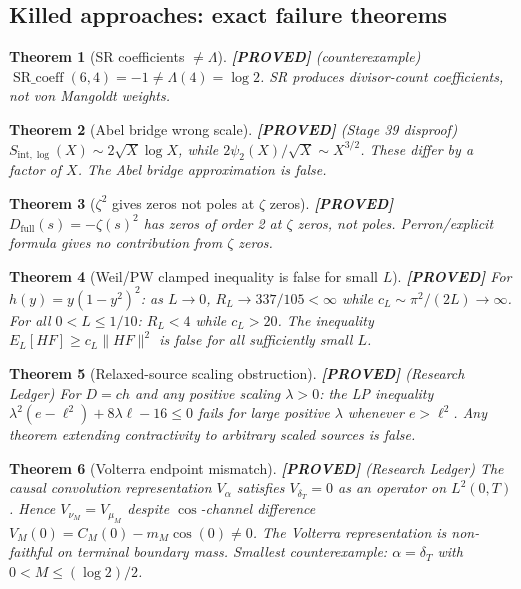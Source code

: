 \documentclass[11pt]{article}
\newtheorem{theorem}{Theorem}[section]
\theoremstyle{remark}
\newcommand{\PROVED}{\textbf{\color{blue}[PROVED]}}
\begin{document}
\subsection{Killed approaches: exact failure theorems}

\begin{theorem}[SR coefficients $\neq \Lambda$] \PROVED{} (counterexample)
$\operatorname{SR\_coeff}(6, 4) = -1 \neq \Lambda(4) = \log 2$.
SR produces divisor-count coefficients, not von Mangoldt weights.
\end{theorem}

\begin{theorem}[Abel bridge wrong scale] \PROVED{} (Stage 39 disproof)
$S_{\mathrm{int},\log}(X) \sim 2\sqrt{X}\log X$, while $2\psi_2(X)/\sqrt{X} \sim X^{3/2}$.
These differ by a factor of $X$. The Abel bridge approximation is false.
\end{theorem}

\begin{theorem}[$\zeta^2$ gives zeros not poles at $\zeta$ zeros] \PROVED{}
$D_{\mathrm{full}}(s) = -\zeta(s)^2$ has \emph{zeros} of order 2 at $\zeta$ zeros,
not poles. Perron/explicit formula gives no contribution from $\zeta$ zeros.
\end{theorem}

\begin{theorem}[Weil/PW clamped inequality is false for small $L$] \PROVED{}
For $h(y) = y(1-y^2)^2$: as $L \to 0$, $R_L \to 337/105 < \infty$
while $c_L \sim \pi^2/(2L) \to \infty$.
For all $0 < L \leq 1/10$: $R_L < 4$ while $c_L > 20$.
The inequality $E_L[HF] \geq c_L\|HF\|^2$ is false for all sufficiently small $L$.
\end{theorem}

\begin{theorem}[Relaxed-source scaling obstruction] \PROVED{} (Research Ledger)
For $D = ch$ and any positive scaling $\lambda > 0$: the LP inequality
$\lambda^2(e - \ell^2) + 8\lambda\ell - 16 \leq 0$ fails for large positive $\lambda$ whenever $e > \ell^2$.
Any theorem extending contractivity to arbitrary scaled sources is false.
\end{theorem}

\begin{theorem}[Volterra endpoint mismatch] \PROVED{} (Research Ledger)
The causal convolution representation $V_\alpha$ satisfies $V_{\delta_T} = 0$ as an operator on $L^2(0,T)$.
Hence $V_{\nu_M} = V_{\mu_M}$ despite $\cos$-channel difference $V_M(0) = C_M(0) - m_M \cos(0) \neq 0$.
The Volterra representation is non-faithful on terminal boundary mass.
Smallest counterexample: $\alpha = \delta_T$ with $0 < M \leq (\log 2)/2$.
\end{theorem}
\end{document}
